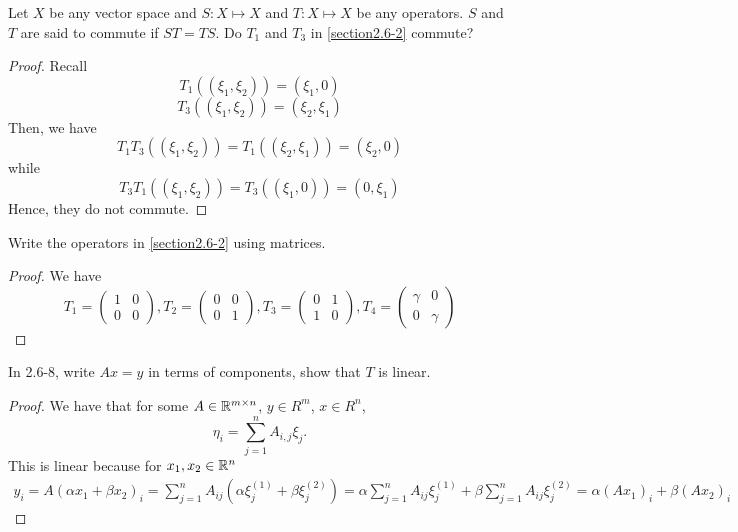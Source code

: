   \begin{question}
      Let $X$ be any vector space and $S : X \mapsto X$ and $T : X \mapsto X$ be any operators. $S$ and $T$ are said to commute if $ST = TS$. Do $T_1$ and $T_3$ in \ref{section2.6-2} commute?
      \label{section2.6-7}
  \end{question}
  \begin{proof}
      Recall
      \[T_1((\xi_1 , \xi_2)) = (\xi_1 , 0)\]
      \[T_3((\xi_1 , \xi_2)) = (\xi_2 , \xi_1)\]
      Then, we have
      \[T_1T_3((\xi_1 , \xi_2)) = T_1 ((\xi_2 , \xi_1)) = (\xi_2 , 0)\]
      while
      \[T_3T_1((\xi_1 , \xi_2)) = T_3((\xi_1 , 0)) = (0,\xi_1)\]
      Hence, they do not commute.
  \end{proof}

  \begin{question}
      Write the operators in \ref{section2.6-2} using matrices.
    \label{section2.6-8}
  \end{question}
  \begin{proof}
      We have
      \[T_1 = \begin{pmatrix} 1 & 0 \\ 0 & 0 \end{pmatrix}, T_2 = \begin{pmatrix} 0 & 0\\0 & 1 \end{pmatrix} , T_3 = \begin{pmatrix} 0 & 1 \\ 1 & 0 \end{pmatrix}, T_4 = \begin{pmatrix} \gamma & 0 \\ 0 & \gamma \end{pmatrix}\]
  \end{proof}

  \begin{question}
      In 2.6-8, write $Ax = y$ in terms of components, show that $T$ is linear.
      \label{section2.6-9}
  \end{question}
  \begin{proof}
      We have that for some $A \in \mathbb{R}^{m \times n}$, $y \in R^m$, $x \in R^n$,
      \[\eta_i = \sum_{j=1}^n A_{i,j} \xi_j.\]
      This is linear because for $x_1 , x_2 \in \mathbb{R}^n$
      \begin{align*}
          y_i = A(\alpha x_1 + \beta x_2)_i = \sum_{j=1}^n A_{ij} (\alpha \xi^{(1)}_j + \beta \xi^{(2)}_j) 
          = \alpha \sum_{j=1}^n  A_{ij} \xi^{(1)}_j + \beta \sum_{j=1}^n A_{ij} \xi^{(2)}_j = \alpha (Ax_1)_i + \beta (Ax_2)_i
      \end{align*}
  \end{proof}

